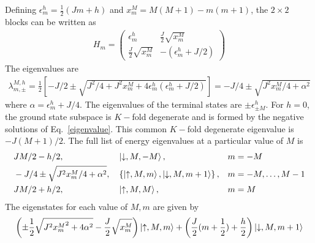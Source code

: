 \documentclass[12pt]{revtex4-2}
\begin{document}
Defining \(\epsilon^h_m = \frac{1}{2}\left(Jm + h\right) \) and \(x^M_m = M(M+1) - m(m+1)\), the \(2\times 2\) blocks can be written as
\begin{align}
	H_m = \begin{pmatrix} \epsilon^h_m & \frac{J}{2}\sqrt{x^M_m} \\ \frac{J}{2}\sqrt{x^M_m} & -\left( \epsilon^h_m + J/2 \right)   \end{pmatrix} 
\end{align}
The eigenvalues are 
\begin{align}
	\label{eigenvalue}
	\lambda_{m, \pm}^{M, h} = \frac{1}{2}\left[-J/2 \pm \sqrt{J^2/4 + J^2 x_m^M + 4\epsilon^h_m\left(\epsilon^h_m + J/2\right) }\right] = -J/4 \pm \sqrt{J^2x^M_m/4 + \alpha^2}
\end{align}
where \(\alpha = \epsilon^h_m + J/4\).
The eigenvalues of the terminal states are \(\pm\epsilon^h_{\pm M}\). For \(h = 0\), the ground state subspace is \(K-\)fold degenerate and is formed by the negative solutions of Eq.~\ref{eigenvalue}. This common \(K-\)fold degenerate eigenvalue is \(-J(M+1)/2\).
The full list of energy eigenvalues at a particular value of \(M\) is
\begin{align}
\label{stargraph_spectrum}
&		JM/2 - h/2, &&\ket{\downarrow, M, -M}, && m = -M\\
&-J/4 \pm \sqrt{J^2x^M_m/4 + \alpha^2}, &&\left\{\ket{\uparrow, M, m}, \ket{\downarrow, M, m+1}\right\}, &&m=-M,\ldots,M-1\\
&JM/2 + h/2, &&\ket{\uparrow, M, M},&& m = M\\
\end{align}
The eigenstates for each value of \(M,m\) are given by
\begin{align}
	\left(\pm\frac{1}{2}\sqrt{J^2 {x_m^M}^2 + 4\alpha^2} - \frac{J}{2}\sqrt{x_m^M}\right)\ket{\uparrow, M, m} + \left(\frac{J}{2}(m+\frac{1}{2}) + \frac{h}{2}\right) \ket{\downarrow, M, m+1}
\end{align}
\end{document}
